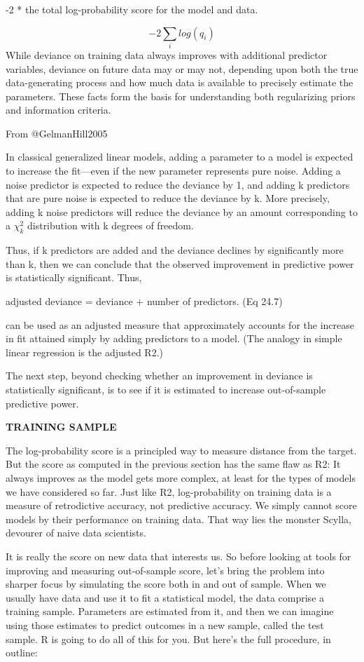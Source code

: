 \documentclass[
]{article}
\begin{document}
-2 * the total log-probability score for the model and data.

\[-2\sum_{i}log(q_i)\] While deviance on training data always improves
with additional predictor variables, deviance on future data may or may
not, depending upon both the true data-generating process and how much
data is available to precisely estimate the parameters. These facts form
the basis for understanding both regularizing priors and information
criteria.

From @GelmanHill2005

In classical generalized linear models, adding a parameter to a model is
expected to increase the fit---even if the new parameter represents pure
noise. Adding a noise predictor is expected to reduce the deviance by 1,
and adding k predictors that are pure noise is expected to reduce the
deviance by k. More precisely, adding k noise predictors will reduce the
deviance by an amount corresponding to a \(\chi^2_k\) distribution with
k degrees of freedom.

Thus, if k predictors are added and the deviance declines by
significantly more than k, then we can conclude that the observed
improvement in predictive power is statistically significant. Thus,

adjusted deviance = deviance + number of predictors. (Eq 24.7)

can be used as an adjusted measure that approximately accounts for the
increase in fit attained simply by adding predictors to a model. (The
analogy in simple linear regression is the adjusted R2.)

The next step, beyond checking whether an improvement in deviance is
statistically significant, is to see if it is estimated to increase
out-of-sample predictive power.

\textbf{TRAINING SAMPLE}

The log-probability score is a principled way to measure distance from
the target. But the score as computed in the previous section has the
same flaw as R2: It always improves as the model gets more complex, at
least for the types of models we have considered so far. Just like R2,
log-probability on training data is a measure of retrodictive accuracy,
not predictive accuracy. We simply cannot score models by their
performance on training data. That way lies the monster Scylla, devourer
of naive data scientists.

It is really the score on new data that interests us. So before looking
at tools for improving and measuring out-of-sample score, let's bring
the problem into sharper focus by simulating the score both in and out
of sample. When we usually have data and use it to fit a statistical
model, the data comprise a training sample. Parameters are estimated
from it, and then we can imagine using those estimates to predict
outcomes in a new sample, called the test sample. R is going to do all
of this for you. But here's the full procedure, in outline:
\end{document}
